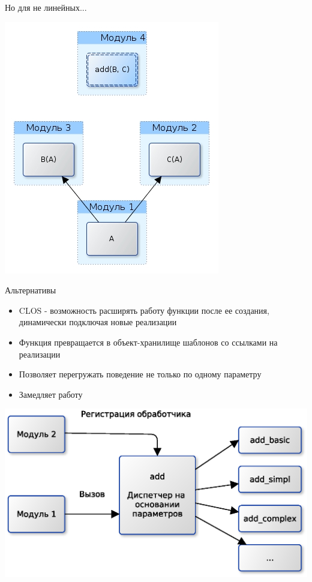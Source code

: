 \documentclass{article}
\begin{document}
\begin{center} Но для не линейных... \end{center}
    \begin{center} \includegraphics[scale=0.9]{images/virtual_problem.jpg} \end{center}
\newpage

\begin{center} Альтернативы \end{center}
\begin{itemize}
    \item CLOS - возможность расширять работу функции после ее создания,
          динамически подключая новые реализации
    \item Функция превращается в объект-хранилище шаблонов со ссылками на реализации
    \item Позволяет перегружать поведение не только по одному параметру
    \item Замедляет работу
\end{itemize}
\begin{center} \includegraphics[scale=0.8]{images/CLOS.eps} \end{center} 
\newpage
\end{document}
